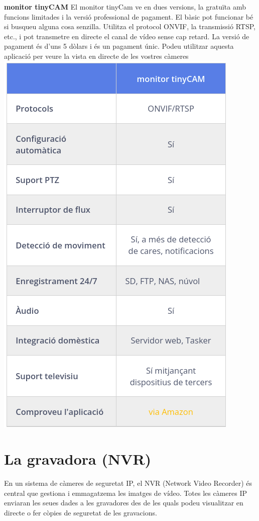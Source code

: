 \documentclass[
  10pt,
]{krantz}
\begin{document}
\textbf{monitor tinyCAM} El monitor tinyCam ve en dues versions, la gratuïta amb funcions limitades i la versió professional de pagament. El bàsic pot funcionar bé si busqueu alguna cosa senzilla. Utilitza el protocol ONVIF, la transmissió RTSP, etc., i pot transmetre en directe el canal de vídeo sense cap retard. La versió de pagament és d'uns 5 dòlars i és un pagament únic. Podeu utilitzar aquesta aplicació per veure la vista en directe de les vostres càmeres \includegraphics{imatges/tinycam.png}

\hypertarget{la-gravadora-nvr}{%
\section{La gravadora (NVR)}\label{la-gravadora-nvr}}

En un sistema de càmeres de seguretat IP, el NVR (Network Video Recorder) és central que gestiona i emmagatzema les imatges de vídeo. Totes les càmeres IP enviaran les seues dades a les gravadores des de les quals podeu visualitzar en directe o fer còpies de seguretat de les gravacions.
\end{document}
